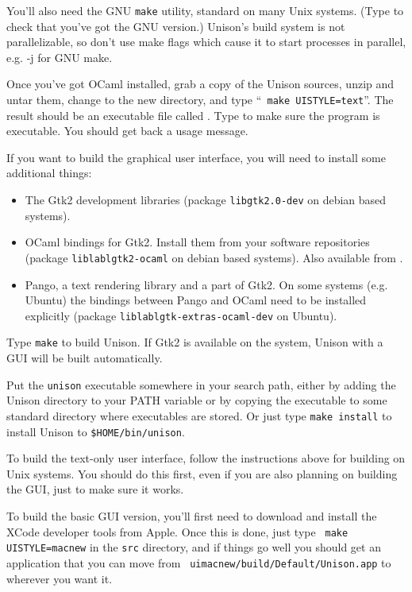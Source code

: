 \documentclass{article}
\begin{document}
You'll also need the GNU {\tt make} utility, standard on many Unix
systems. (Type  to check that you've got the
GNU version.)  Unison's build system is
not parallelizable, so don't use make flags which cause it to start
processes in parallel, e.g. -j for GNU make.

Once you've got OCaml installed, grab a copy of the Unison sources, unzip
and untar them, change to the new  directory, and type ``{\tt
  make UISTYLE=text}''.  The result should be an executable file called
.  Type  to make sure the program is
executable.  You should get back a usage message.

If you want to build the graphical user interface, you will need to install
some additional things:
\begin{itemize}
\item The Gtk2 development libraries (package {\tt libgtk2.0-dev} on debian
based systems).
\item OCaml bindings for Gtk2. Install them from your software repositories
(package {\tt liblablgtk2-ocaml} on debian based systems). Also available
from .
\item Pango, a text rendering library and a part of Gtk2. On some systems
(e.g. Ubuntu) the bindings between Pango and OCaml need to be installed
explicitly (package {\tt liblablgtk-extras-ocaml-dev} on Ubuntu).
\end{itemize}
Type {\tt make} to build Unison. If Gtk2 is available on the system, Unison
with a GUI will be built automatically. 

Put the \verb|unison| executable somewhere in your search path, either by
adding the Unison directory to your PATH variable or by copying the
executable to some standard directory where executables are stored.  Or just
type {\tt make install} to install Unison to {\tt \$HOME/bin/unison}.


To build the text-only user interface, follow the instructions above for
building on Unix systems.  You should do this first, even if you are also
planning on building the GUI, just to make sure it works.

To build the basic GUI version, you'll first need to download and install
the XCode developer tools from Apple.  Once this is done, just type {\tt
  make UISTYLE=macnew} in the {\tt src} directory, and if things go well you
should get an application that you can move from {\tt
  uimacnew/build/Default/Unison.app} to wherever you want it.
\end{document}
